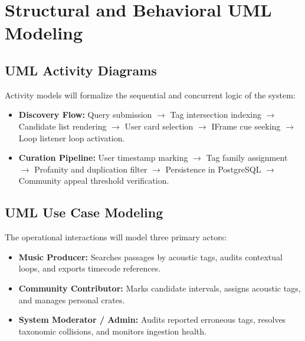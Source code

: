 \section{Structural and Behavioral UML Modeling}

\subsection{UML Activity Diagrams}
Activity models will formalize the sequential and concurrent logic of the system:
\begin{itemize}
    \item \textbf{Discovery Flow:} Query submission $\rightarrow$ Tag intersection indexing $\rightarrow$ Candidate list rendering $\rightarrow$ User card selection $\rightarrow$ IFrame cue seeking $\rightarrow$ Loop listener loop activation.
    \item \textbf{Curation Pipeline:} User timestamp marking $\rightarrow$ Tag family assignment $\rightarrow$ Profanity and duplication filter $\rightarrow$ Persistence in PostgreSQL $\rightarrow$ Community appeal threshold verification.
\end{itemize}

\subsection{UML Use Case Modeling}
The operational interactions will model three primary actors:
\begin{itemize}
    \item \textbf{Music Producer:} Searches passages by acoustic tags, audits contextual loops, and exports timecode references.
    \item \textbf{Community Contributor:} Marks candidate intervals, assigns acoustic tags, and manages personal crates.
    \item \textbf{System Moderator / Admin:} Audits reported erroneous tags, resolves taxonomic collisions, and monitors ingestion health.
\end{itemize}

